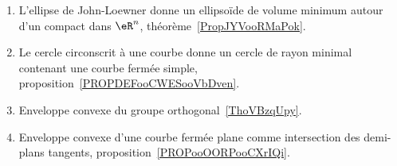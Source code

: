 
\begin{enumerate}
	\item
	      L'ellipse de John-Loewner donne un ellipsoïde de volume minimum autour d'un compact dans \( \eR^n\), théorème~\ref{PropJYVooRMaPok}.
	\item
	      Le cercle circonscrit à une courbe donne un cercle de rayon minimal contenant une courbe fermée simple, proposition~\ref{PROPDEFooCWESooVbDven}.
	\item Enveloppe convexe du groupe orthogonal~\ref{ThoVBzqUpy}.
	\item Enveloppe convexe d'une courbe fermée plane comme intersection des demi-plans tangents, proposition~\ref{PROPooOORPooCXrIQi}.
\end{enumerate}
